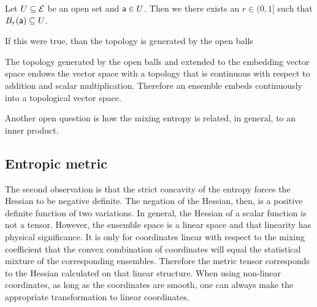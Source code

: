 \begin{conj}
	Let $U \subseteq \Ens$ be an open set and $\ens[a] \in U$. Then we there exists an $r \in (0,1]$ such that $B_r(\ens[a]) \subseteq U$.
\end{conj}

\begin{remark}
	If this were true, than the topology is generated by the open balls
\end{remark}

\begin{conj}
	The topology generated by the open balls and extended to the embedding vector space endows the vector space with a topology that is continuous with respect to addition and scalar multiplication. Therefore an ensemble embeds continuously into a topological vector space.
\end{conj}

Another open question is how the mixing entropy is related, in general, to an inner product.

\subsection{Entropic metric}

The second observation is that the strict concavity of the entropy forces the Hessian to be negative definite. The negation of the Hessian, then, is a positive definite function of two variations. In general, the Hessian of a scalar function is not a tensor. However, the ensemble space is a linear space and that linearity has physical significance. It is only for coordinates linear with respect to the mixing coefficient that the convex combination of coordinates will equal the statistical mixture of the corresponding ensembles. Therefore the metric tensor corresponds to the Hessian calculated on that linear structure. When using non-linear coordinates, as long as the coordinates are smooth, one can always make the appropriate transformation to linear coordinates.

